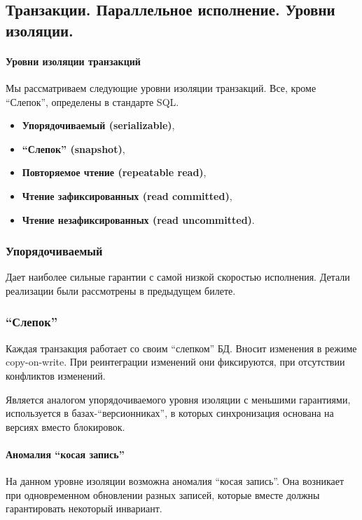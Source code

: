 \subsection{Транзакции. Параллельное исполнение. Уровни изоляции.}

\paragraph{Уровни изоляции транзакций}

Мы рассматриваем следующие уровни изоляции транзакций. Все, кроме ``Слепок'', определены в стандарте
SQL.

\begin{itemize}
    \item \textbf{Упорядочиваемый (serializable)},
    \item \textbf{``Слепок'' (snapshot)},
    \item \textbf{Повторяемое чтение (repeatable read)},
    \item \textbf{Чтение зафиксированных (read committed)},
    \item \textbf{Чтение незафиксированных (read uncommitted)}.
\end{itemize}

\subsubsection{Упорядочиваемый}

Дает наиболее сильные гарантии с самой низкой скоростью исполнения. Детали реализации были
рассмотрены в предыдущем билете.

\subsubsection{``Слепок''}

Каждая транзакция работает со своим ``слепком'' БД. Вносит изменения в режиме copy-on-write.
При реинтеграции изменений они фиксируются, при отсутствии конфликтов изменений.

Является аналогом упорядочиваемого уровня изоляции с меньшими гарантиями, используется в
базах-``версионниках'', в которых синхронизация основана на версиях вместо блокировок.

\paragraph{Аномалия ``косая запись''}
На данном уровне изоляции возможна аномалия ``косая запись''. Она возникает при одновременном
обновлении разных записей, которые вместе должны гарантировать некоторый инвариант.

